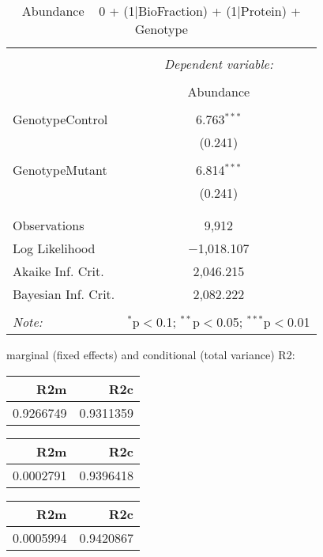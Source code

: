 \documentclass[11pt]{report}
\begin{document}
\begin{table}[!htbp] \centering 
  \caption{Abundance ~ 0 + (1|BioFraction) + (1|Protein) + Genotype} 
  \label{} 
\begin{tabular}{@{\extracolsep{5pt}}lc} 
\\[-1.8ex]\hline 
\hline \\[-1.8ex] 
 & \multicolumn{1}{c}{\textit{Dependent variable:}} \\ 
\cline{2-2} 
\\[-1.8ex] & Abundance \\ 
\hline \\[-1.8ex] 
 GenotypeControl & 6.763$^{***}$ \\ 
  & (0.241) \\ 
  & \\ 
 GenotypeMutant & 6.814$^{***}$ \\ 
  & (0.241) \\ 
  & \\ 
\hline \\[-1.8ex] 
Observations & 9,912 \\ 
Log Likelihood & $-$1,018.107 \\ 
Akaike Inf. Crit. & 2,046.215 \\ 
Bayesian Inf. Crit. & 2,082.222 \\ 
\hline 
\hline \\[-1.8ex] 
\textit{Note:}  & \multicolumn{1}{r}{$^{*}$p$<$0.1; $^{**}$p$<$0.05; $^{***}$p$<$0.01} \\ 
\end{tabular} 
\end{table} 
marginal (fixed effects) and conditional (total variance) R2:

\begin{tabular}{r|r}
\hline
R2m & R2c\\
\hline
0.9266749 & 0.9311359\\
\hline
\end{tabular}

\begin{tabular}{r|r}
\hline
R2m & R2c\\
\hline
0.0002791 & 0.9396418\\
\hline
\end{tabular}

\begin{tabular}{r|r}
\hline
R2m & R2c\\
\hline
0.0005994 & 0.9420867\\
\hline
\end{tabular}
\end{document}
